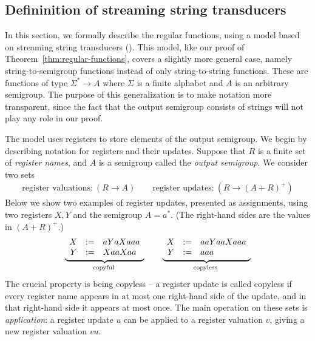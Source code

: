 \subsection{Defininition of streaming string transducers}
\label{sec:sst-definition}
In this section, we formally describe the regular functions, using a model based on streaming string transducers (\sst).  This model, like our proof of Theorem~\ref{thm:regular-functions}, covers a slightly more general case, namely string-to-semigroup functions instead of only string-to-string functions. These are functions of type $\Sigma^* \to A$ where $\Sigma$ is a finite alphabet and $A$ is an arbitrary semigroup.  The purpose of this generalization is to make notation more transparent, since the fact that the output semigroup consists of strings will not play any role in our proof.

The model uses registers to store elements of the output semigroup. We begin by describing notation for registers and their updates. Suppose that $R$ is a finite set of \emph{register names}, and $A$ is a semigroup called the \emph{output semigroup}. We consider two sets 
\begin{align*}
    \text{register valuations:}\ (R \to A)
  \qquad
    \text{register updates:}\ (R \to (A+R)^+)
\end{align*}
Below we show two examples of register updates, presented as assignments, using two registers $X,Y$ and the semigroup $A = a^*$. (The right-hand sides are the values in $(A+R)^+$.)
\begin{align*}
    \myunderbrace{
    \begin{array}{rcl}
        X &:=& aYaXaaa\\
    Y &:=& XaaXaa
    \end{array}
    }{copyful}
    \qquad 
    \myunderbrace{
    \begin{array}{rcl}
        X &:=& aaYaaXaaa\\
    Y &:=& aaa
    \end{array}
    }{copyless}
    \end{align*}
The crucial property is being copyless -- a register update is called copyless if every register name appears in at most one right-hand side of the update, and in that right-hand side it appears at most once. 
The main operation on these sets is \emph{application}: a register update $u$
can be applied to a register valuation $v$, giving a new register valuation $vu$. 


